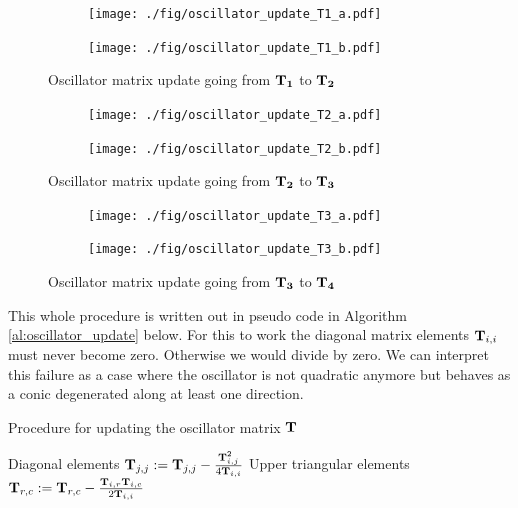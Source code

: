 \documentclass[a4paper,10pt]{article}
\begin{document}
\begin{figure}
  \begin{subfigure}[b]{0.5\linewidth}
    \texttt{[image: ./fig/oscillator\_update\_T1\_a.pdf]}
  \end{subfigure}
  \begin{subfigure}[b]{0.5\linewidth}
    \texttt{[image: ./fig/oscillator\_update\_T1\_b.pdf]}
  \end{subfigure}
  \caption{Oscillator matrix update going from $\mathbf{T_1}$ to $\mathbf{T_2}$}
  \label{fig:oscillator_update_T1}
\end{figure}

\begin{figure}
  \begin{subfigure}[b]{0.5\linewidth}
    \texttt{[image: ./fig/oscillator\_update\_T2\_a.pdf]}
  \end{subfigure}
  \begin{subfigure}[b]{0.5\linewidth}
    \texttt{[image: ./fig/oscillator\_update\_T2\_b.pdf]}
  \end{subfigure}
  \caption{Oscillator matrix update going from $\mathbf{T_2}$ to $\mathbf{T_3}$}
  \label{fig:oscillator_update_T2}
\end{figure}

\begin{figure}
  \begin{subfigure}[b]{0.5\linewidth}
    \texttt{[image: ./fig/oscillator\_update\_T3\_a.pdf]}
  \end{subfigure}
  \begin{subfigure}[b]{0.5\linewidth}
    \texttt{[image: ./fig/oscillator\_update\_T3\_b.pdf]}
  \end{subfigure}
  \caption{Oscillator matrix update going from $\mathbf{T_3}$ to $\mathbf{T_4}$}
  \label{fig:oscillator_update_T3}
\end{figure}

This whole procedure is written out in pseudo code in Algorithm
\ref{al:oscillator_update} below. For this to work the diagonal
matrix elements $\mathbf{T}_{i,i}$ must never become zero. Otherwise
we would divide by zero. We can interpret this failure as a
case where the oscillator is not quadratic anymore but behaves
as a conic degenerated along at least one direction.

\begin{algorithm}
  \caption{Procedure for updating the oscillator matrix $\mathbf{T}$}
  \label{al:oscillator_update}
  \begin{algorithmic}
      \State \Comment Diagonal elements
        \State $\mathbf{T}_{j,j} := \mathbf{T}_{j,j} - \frac{\mathbf{T}_{i,j}^2}{4 \mathbf{T}_{i,i}}$
      \EndFor
      \State \Comment Upper triangular elements
          \State $\mathbf{T}_{r,c} := \mathbf{T}_{r,c} - \frac{\mathbf{T}_{i,r} \mathbf{T}_{i,c}}{2 \mathbf{T}_{i,i}}$
        \EndFor
      \EndFor
    \EndFor
  \end{algorithmic}
\end{algorithm}
\end{document}
